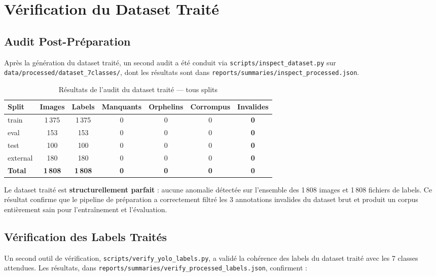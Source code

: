 \documentclass{rapportENSIAS}
\newcommand{\projectpath}[1]{\texttt{#1}}
\begin{document}
\section{Vérification du Dataset Traité}

\subsection{Audit Post-Préparation}

Après la génération du dataset traité, un second audit a été conduit via
\projectpath{scripts/inspect\_dataset.py} sur
\projectpath{data/processed/dataset\_7classes/}, dont les résultats sont
dans
\projectpath{reports/summaries/inspect\_processed.json}.

\begin{table}[H]
\centering
\caption{Résultats de l'audit du dataset traité — tous splits}
\label{tab:audit_processed}
\begin{tabular}{lcccccc}
\toprule
\textbf{Split} & \textbf{Images} & \textbf{Labels} & \textbf{Manquants}
               & \textbf{Orphelins} & \textbf{Corrompus} & \textbf{Invalides} \\
\midrule
train    & 1\,375 & 1\,375 & 0 & 0 & 0 & \textbf{0} \\
eval     & 153    & 153    & 0 & 0 & 0 & \textbf{0} \\
test     & 100    & 100    & 0 & 0 & 0 & \textbf{0} \\
external & 180    & 180    & 0 & 0 & 0 & \textbf{0} \\
\midrule
\textbf{Total} & \textbf{1\,808} & \textbf{1\,808} & \textbf{0} & \textbf{0}
               & \textbf{0} & \textbf{0} \\
\bottomrule
\end{tabular}
\end{table}

Le dataset traité est \textbf{structurellement parfait} : aucune anomalie
détectée sur l'ensemble des 1\,808 images et 1\,808 fichiers de labels.
Ce résultat confirme que le pipeline de préparation a correctement filtré
les 3 annotations invalides du dataset brut et produit un corpus entièrement
sain pour l'entraînement et l'évaluation.

\subsection{Vérification des Labels Traités}

Un second outil de vérification, \projectpath{scripts/verify\_yolo\_labels.py},
a validé la cohérence des labels du dataset traité avec les 7 classes attendues.
Les résultats, dans \projectpath{reports/summaries/verify\_processed\_labels.json},
confirment :
\end{document}
